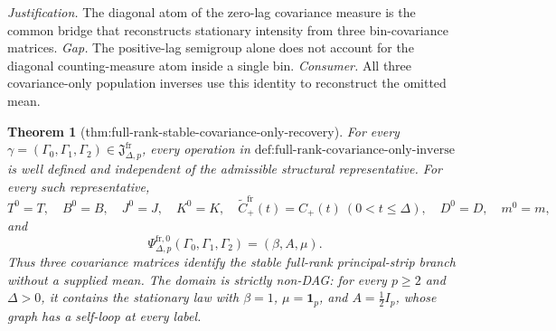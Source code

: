 \documentclass{article}
\newtheorem{theorem}{Theorem}
\begin{document}
\par\smallskip\noindent \textit{Justification.} The diagonal atom of the zero-lag covariance measure is the common bridge that reconstructs stationary intensity from three bin-covariance matrices. \textit{Gap.} The positive-lag semigroup alone does not account for the diagonal counting-measure atom inside a single bin. \textit{Consumer.} All three covariance-only population inverses use this identity to reconstruct the omitted mean.

\begin{theorem}[thm:full-rank-stable-covariance-only-recovery]\label{thm:full-rank-stable-covariance-only-recovery}
For every \(\gamma=(\Gamma_0,\Gamma_1,\Gamma_2)\in\mathfrak J_{\Delta,p}^{\mathrm{fr}}\), every operation in \(\text{def:full-rank-covariance-only-inverse}\) is well defined and independent of the admissible structural representative.  For every such representative,
\[
 T^0=T,\quad B^0=B,\quad J^0=J,\quad K^0=K,
 \quad \widetilde C_{+}^{\mathrm{fr}}(t)=C_{+}(t)\ (0<t\leq\Delta),
 \quad D^0=D,\quad m^0=m,
\]
and
\[
 \Psi_{\Delta,p}^{\mathrm{fr},0}(\Gamma_0,\Gamma_1,\Gamma_2)
 = (\beta,A,\mu).
\]
Thus three covariance matrices identify the stable full-rank principal-strip branch without a supplied mean.  The domain is strictly non-DAG: for every \(p\geq2\) and \(\Delta>0\), it contains the stationary law with \(\beta=1\), \(\mu=\mathbf 1_p\), and \(A=\tfrac12 I_p\), whose graph has a self-loop at every label.
\end{theorem}
\end{document}
